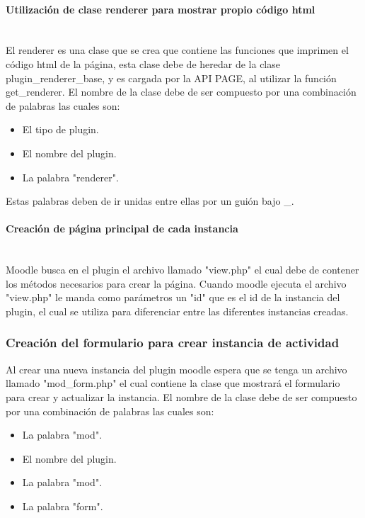 			\paragraph{Utilización de clase renderer para mostrar propio código html}\mbox{}\\

			El renderer es una clase que se crea que contiene las funciones que imprimen el código html de la página, esta clase debe de heredar de la clase plugin\_renderer\_base, y es cargada por la API PAGE, al utilizar la función get\_renderer. El nombre de la clase debe de ser compuesto por una combinación de palabras las cuales son:
      \begin{itemize}
        \item El tipo de plugin.
        \item El nombre del plugin.
        \item La palabra "renderer".
      \end{itemize}

			Estas palabras deben de ir unidas entre ellas por un guión bajo \_.

    \paragraph{Creación de página principal de cada instancia}\mbox{}\\

			Moodle busca en el plugin el archivo llamado "view.php" el cual debe de contener los métodos necesarios para crear la página. Cuando moodle ejecuta el archivo "view.php" le manda como parámetros un "id" que es el id de la instancia del plugin, el cual se utiliza para diferenciar entre las diferentes instancias creadas.

  \subsubsection{Creación del formulario para crear instancia de actividad}
		Al crear una nueva instancia del plugin moodle espera que se tenga un archivo llamado "mod\_form.php" el cual contiene la clase que mostrará el formulario para crear y actualizar la instancia. El nombre de la clase debe de ser compuesto por una combinación de palabras las cuales son:
    \begin{itemize}
      \item La palabra "mod".
      \item El nombre del plugin.
      \item La palabra "mod".
      \item La palabra "form".
    \end{itemize}

